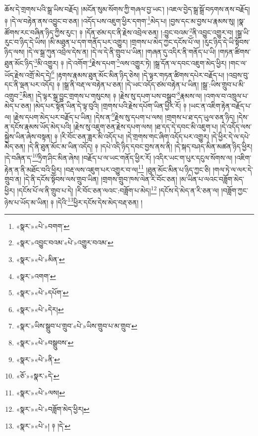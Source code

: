 ཆོས་དེ་གྲགས་པའི་སྒྲ་ཡིས་བརྗོད། །མངོན་སུམ་སོགས་ཀྱི་གཞལ་བྱ་ཡང་། །འཇལ་བྱེད་སྒྲ་སྒྲོ་བཏགས་ནས་བརྗོད། ༈ །དེ་ལ་བརྟེན་ནས་འབྱུང་བ་ཅན། །འདོད་པས་འཇུག་ཕྱིར་དགག་\footnote{«སྣར་»«པེ་»བགག་}མེད་པ། །བྱས་དང་མ་བྱས་པ་རྣམས་སུ། །སྣ་ཚོགས་རང་བཞིན་ཉིད་ཀྱིས་རུང་། ༈ །དོན་ཙམ་དང་ནི་རྗེས་འབྲེལ་ཅན། །:བྱུང་བའམ་\footnote{«སྣར་»འབྱུང་བའམ་«པེ་»འགྱུར་བའམ་}ནི་འབྱུང་འགྱུར་བ། །སྒྲ་ཡི་རུང་བ་ཉིད་དེ་ཡིས། །མི་མཐུན་པ་དག་གནོད་པར་འགྱུར། །གྲགས་པ་མེད་ཀྱང་དངོས་པོ་ལ། །རུང་ཉིད་དེ་ཡི་སྟོབས་ཉིད་ལས། །དེ་ལ་སྒྲ་ཀུན་འབྲེལ་དེས་ན། །དེ་ལ་དེ་ནི་གྲུབ་པ་ཡིན། །གཞན་དུ་འདིར་ནི་གནོད་པ་ཡི། །གཏན་ཚིགས་ཐུན་མོང་ཉིད་\footnote{«སྣར་»«པེ་»མིན་}མི་འགྱུར། ༈ །དེ་འགོག་\footnote{«སྣར་»འགག་}རྗེས་དཔག་\footnote{«སྣར་»«པེ་»དཔོག་}ལས་འགྱུར་ཏེ། །སྒྲ་དོན་ལ་དབང་འཇུག་མེད་ཕྱིར། །གང་ལ་ཡོད་རྗེས་འགྲོ་མེད་དེ།\footnote{«སྣར་»«པེ་»དེར།} །རྟགས་རྣམས་ཐུན་མོང་མིན་ཉིད་ཅེས། །དེ་ལྟར་གཏན་ཚིགས་དཔེར་བརྗོད་པ། །འབྲས་བུ་དང་ནི་ལྡན་པར་འདོད། ༈ །སྒྲ་ནི་བརྡ་ལ་བརྟེན་པ་ཅན། །དེ་ཡང་འདོད་ཙམ་བརྟེན་པ་ཡིན། །སྒྲ་:ཡིས་གྲུབ་པ་མི་འགྲུབ་\footnote{«སྣར་»ཡིས་སྒྲུབ་པ་གྲུབ་«པེ་»ཡིས་གྲུབ་པ་མ་གྲུབ་}མིན། །དེ་ལྟར་སྒྲ་བྱུང་གྲགས་པ་གསུངས། ༈ །རྗེས་སུ་དཔག་པས་བསྒྲུབ་\footnote{«སྣར་»«པེ་»བསྒྲུབས་}རྣམས་ལ། །འགལ་བ་འཁྲུལ་པ་མེད་པ་ཅན། །མེད་པར་སྟོན་ཡིན་དེ་ལྟ་བུའི། །གྲགས་པའི་རྗེས་དཔོག་ཡིན་ཕྱིར་རོ། ༈ །ཡང་ན་འཇིག་རྟེན་བརྗོད་པ་ལ། །རྗེས་དཔག་མེད་པར་བརྗོད་པ་ཡིན། །དེས་ན་\footnote{«སྣར་»«པེ་»ནི་}རྗེས་སུ་དཔག་པ་ལས། །གྲགས་པ་ཐ་དད་ཡུལ་ཅན་ཉིད། །དེས་ན་དངོས་རྣམས་ཡོད་མེད་པའི། །རྗེས་སུ་འཇུག་ཅན་རྗེས་དཔག་ལས། །ཐ་དད་དེ་དབང་མི་འཇུག་པ། །དེ་འདོད་ལས་སྐྱེས་ཡིན་ཞེས་བསྟན། ༈ །རི་བོང་ཅན་ཟླར་མི་འདོད་པ། །དེ་གྲགས་གང་ཞིག་འདོད་པར་འགྱུར། །དེ་ཕྱིར་དེ་ལ་དཔེ་མེད་ཅན། །དེ་ནི་ཐུན་མོང་མ་ཡིན་འདོད། ༈ །དཔེ་འདི་ཉིད་དབང་བྱས་ནས་ནི། །དེ་སྐད་བཤད་མིན་མཚན་ཉིད་ཕྱིར། །དེ་བཞིན་ད་\footnote{«ཅོ་»«སྣར་»དེ་}ཏྲིག་ཤིང་མིན་ཞེས། །བརྗོད་པ་ལ་ཡང་གནོད་ཕྱིར་རོ། །འདིར་ཡང་ག་པུར་དངུལ་སོགས་ལ། །འཇིག་རྟེན་ན་ནི་མཐོང་བའི་ཕྱིར། །བརྡ་ལས་འཇུག་པར་འགྱུར་བ་ལ།\footnote{«སྣར་»«པེ་»ལས།} །ཐུན་མོང་མིན་པ་ཉིད་ཀྱང་ཅི། །གལ་ཏེ་ལ་ལར་དེ་གྲུབ་ན། །དེ་ནི་དངོས་སྟོབས་ལས་གྲུབ་ཡིན། །གྲགས་གྲུབ་ཁས་ལེན་རི་བོང་ཅན། །མ་ཡིན་པ་ལའང་བཟློག་མེད་ཕྱིར། །དངོས་པོ་ལ་ནི་གྲུབ་པ་དེ། །རི་བོང་ཅན་ལའང་:བཟློག་པ་མེད།\footnote{«སྣར་»«པེ་»བཟློག་མེད་ཕྱིར།} །དངོས་དེ་མེད་ན་རི་ཅན་ལ། །བཟློག་ཀྱང་ཉེས་པ་ཡོད་མ་ཡིན། ༈ །དེའི་\footnote{«སྣར་»«པེ་»། ༈ །དེ་}ཕྱིར་དངོས་དེས་མེད་བརྡ་ཅན། །

